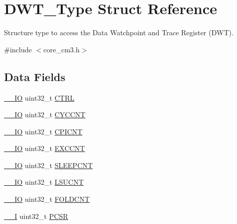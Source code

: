 \hypertarget{struct_d_w_t___type}{}\section{D\+W\+T\+\_\+\+Type Struct Reference}
\label{struct_d_w_t___type}


Structure type to access the Data Watchpoint and Trace Register (D\+WT).  




{\ttfamily \#include $<$core\+\_\+cm3.\+h$>$}

\subsection*{Data Fields}
\begin{DoxyCompactItemize}
\item 
\mbox{\hyperlink{core__sc300_8h_aec43007d9998a0a0e01faede4133d6be}{\+\_\+\+\_\+\+IO}} uint32\+\_\+t \mbox{\hyperlink{struct_d_w_t___type_a15fc8d35f045f329b80c544bef35ff64}{C\+T\+RL}}
\item 
\mbox{\hyperlink{core__sc300_8h_aec43007d9998a0a0e01faede4133d6be}{\+\_\+\+\_\+\+IO}} uint32\+\_\+t \mbox{\hyperlink{struct_d_w_t___type_acf6d1c3e5f5cef92986fd9cfae5c7224}{C\+Y\+C\+C\+NT}}
\item 
\mbox{\hyperlink{core__sc300_8h_aec43007d9998a0a0e01faede4133d6be}{\+\_\+\+\_\+\+IO}} uint32\+\_\+t \mbox{\hyperlink{struct_d_w_t___type_a49a1dced8d644fa6f4128570f102212e}{C\+P\+I\+C\+NT}}
\item 
\mbox{\hyperlink{core__sc300_8h_aec43007d9998a0a0e01faede4133d6be}{\+\_\+\+\_\+\+IO}} uint32\+\_\+t \mbox{\hyperlink{struct_d_w_t___type_ae6edad4ef9f92b3ce206dac61621871a}{E\+X\+C\+C\+NT}}
\item 
\mbox{\hyperlink{core__sc300_8h_aec43007d9998a0a0e01faede4133d6be}{\+\_\+\+\_\+\+IO}} uint32\+\_\+t \mbox{\hyperlink{struct_d_w_t___type_a720f3795a53a8d8f275df636fee1aee7}{S\+L\+E\+E\+P\+C\+NT}}
\item 
\mbox{\hyperlink{core__sc300_8h_aec43007d9998a0a0e01faede4133d6be}{\+\_\+\+\_\+\+IO}} uint32\+\_\+t \mbox{\hyperlink{struct_d_w_t___type_ab1d62b8e1a69bead9717d5a02f741811}{L\+S\+U\+C\+NT}}
\item 
\mbox{\hyperlink{core__sc300_8h_aec43007d9998a0a0e01faede4133d6be}{\+\_\+\+\_\+\+IO}} uint32\+\_\+t \mbox{\hyperlink{struct_d_w_t___type_a11e6aebbf2c7bedc29059ff023891b82}{F\+O\+L\+D\+C\+NT}}
\item 
\mbox{\hyperlink{core__sc300_8h_af63697ed9952cc71e1225efe205f6cd3}{\+\_\+\+\_\+I}} uint32\+\_\+t \mbox{\hyperlink{struct_d_w_t___type_accef6b622c8a41342ed32345b0922bea}{P\+C\+SR}}

\end{DoxyCompactItemize}
